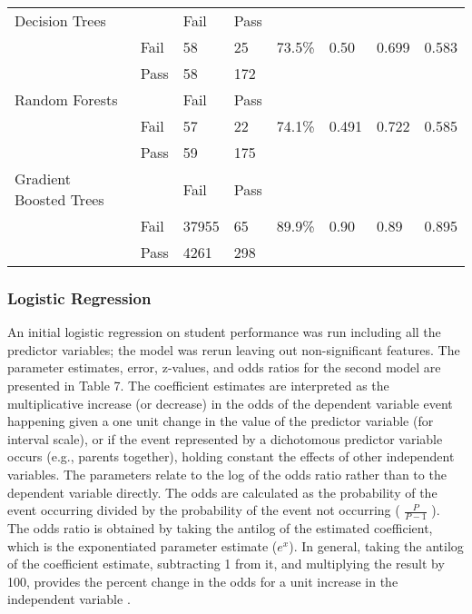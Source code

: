 \documentclass[sigconf]{acmart}
\begin{document}
\begin{table*}[ht]
\begin{tabular}{llllllll}
    \midrule
    Decision Trees & & Fail & Pass &  &  &  & \\
     & Fail &  58 &  25 & 73.5\% & 0.50 & 0.699 & 0.583 \\
     & Pass &  58 & 172 &  &  &  & \\
    \midrule
    Random Forests & & Fail & Pass &  &  &  & \\
     & Fail &  57 &  22 & 74.1\% & 0.491 & 0.722 & 0.585 \\
     & Pass &  59 & 175 &  &  &  & \\
    \midrule
    Gradient Boosted Trees & & Fail & Pass &  &  &  & \\
     & Fail & 37955 &  65 & 89.9\% & 0.90 & 0.89 & 0.895 \\
     & Pass & 4261 & 298 &  &  &  & \\
    \bottomrule
  \end{tabular}
\end{table*}


\subsubsection{Logistic Regression}

An initial logistic regression on student performance was run including all 
the predictor variables; the model was rerun leaving out non-significant 
features. The parameter estimates, error, z-values, and odds ratios for the 
second model are presented in Table 7. The coefficient estimates are 
interpreted as the multiplicative increase (or decrease) in the odds of the 
dependent variable event happening given a one unit change in the value of 
the predictor variable (for interval scale), or if the event represented 
by a dichotomous predictor variable occurs (e.g., parents together), holding
constant the effects of other independent variables. The parameters relate to 
the log of the odds ratio rather than to the dependent variable directly. 
The odds are calculated as the probability of the event occurring divided 
by the probability of the event not occurring ( \(\frac{P}{P-1}\) ). The 
odds ratio is obtained by taking the antilog of the estimated coefficient, 
which is the exponentiated parameter estimate ($e^x$). In general, taking the 
antilog of the coefficient estimate, subtracting 1 from it, and multiplying 
the result by 100, provides the percent change in the odds for a unit 
increase in the independent variable  \cite{gujarati09}.  
\end{document}
